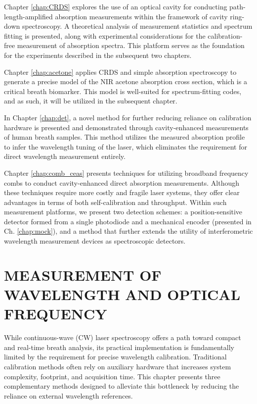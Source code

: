 \documentclass[12pt]{report}
\begin{document}
	Chapter \ref{chap:CRDS} explores the use of an optical cavity for conducting path-length-amplified absorption measurements within the framework of cavity ring-down spectroscopy. A theoretical analysis of measurement statistics and spectrum fitting is presented, along with experimental considerations for the calibration-free measurement of absorption spectra. This platform serves as the foundation for the experiments described in the subsequent two chapters.
	
	Chapter \ref{chap:acetone} applies CRDS and simple absorption spectroscopy to generate a precise model of the NIR acetone absorption cross section, which is a critical breath biomarker. This model is well-suited for spectrum-fitting codes, and as such, it will be utilized in the subsequent chapter.
	
	In Chapter \ref{chap:det}, a novel method for further reducing reliance on calibration hardware is presented and demonstrated through cavity-enhanced measurements of human breath samples. This method utilizes the measured absorption profile to infer the wavelength tuning of the laser, which eliminates the requirement for direct wavelength measurement entirely.
	
	Chapter \ref{chap:comb_ceas} presents techniques for utilizing broadband frequency combs to conduct cavity-enhanced direct absorption measurements. Although these techniques require more costly and fragile laser systems, they offer clear advantages in terms of both self-calibration and throughput. Within such measurement platforms, we present two detection schemes: a position-sensitive detector formed from a single photodiode and a mechanical encoder (presented in Ch. \ref{chap:mock}), and a method that further extends the utility of interferometric wavelength measurement devices as spectroscopic detectors.
	
	
		
	\chapter{MEASUREMENT OF WAVELENGTH AND OPTICAL FREQUENCY} \label{chap:wl}
	While continuous-wave (CW) laser spectroscopy offers a path toward compact and real-time breath analysis, its practical implementation is fundamentally limited by the requirement for precise wavelength calibration. Traditional calibration methods often rely on auxiliary hardware that increases system complexity, footprint, and acquisition time. This chapter presents three complementary methods designed to alleviate this bottleneck by reducing the reliance on external wavelength references.
	
\end{document}
